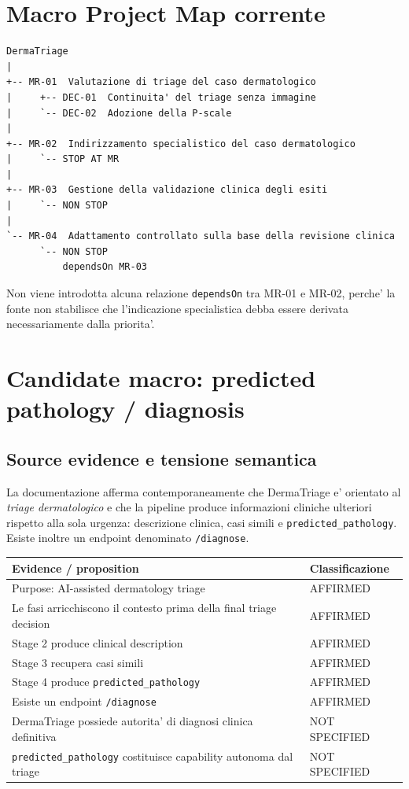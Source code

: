 \documentclass[11pt,a4paper]{article}
\begin{document}
\section{Macro Project Map corrente}

\begin{ddtacore}[title={State after MR-02 / MR-03 / MR-04 review}]
\begin{lstlisting}
DermaTriage
|
+-- MR-01  Valutazione di triage del caso dermatologico
|     +-- DEC-01  Continuita' del triage senza immagine
|     `-- DEC-02  Adozione della P-scale
|
+-- MR-02  Indirizzamento specialistico del caso dermatologico
|     `-- STOP AT MR
|
+-- MR-03  Gestione della validazione clinica degli esiti
|     `-- NON STOP
|
`-- MR-04  Adattamento controllato sulla base della revisione clinica
      `-- NON STOP
          dependsOn MR-03
\end{lstlisting}
\end{ddtacore}

Non viene introdotta alcuna relazione \texttt{dependsOn} tra MR-01 e MR-02, perche' la fonte non stabilisce che l'indicazione specialistica debba essere derivata necessariamente dalla priorita'.


\section{Candidate macro: predicted pathology / diagnosis}

\subsection{Source evidence e tensione semantica}

La documentazione afferma contemporaneamente che DermaTriage e' orientato al \emph{triage dermatologico} e che la pipeline produce informazioni cliniche ulteriori rispetto alla sola urgenza: descrizione clinica, casi simili e \texttt{predicted\_pathology}. Esiste inoltre un endpoint denominato \texttt{/diagnose}.

\begin{tabularx}{\textwidth}{L{67mm}L{33mm}}
\toprule
\textbf{Evidence / proposition} & \textbf{Classificazione} \\
\midrule
Purpose: AI-assisted dermatology triage & AFFIRMED \\
Le fasi arricchiscono il contesto prima della final triage decision & AFFIRMED \\
Stage 2 produce clinical description & AFFIRMED \\
Stage 3 recupera casi simili & AFFIRMED \\
Stage 4 produce \texttt{predicted\_pathology} & AFFIRMED \\
Esiste un endpoint \texttt{/diagnose} & AFFIRMED \\
DermaTriage possiede autorita' di diagnosi clinica definitiva & NOT SPECIFIED \\
\texttt{predicted\_pathology} costituisce capability autonoma dal triage & NOT SPECIFIED \\
\bottomrule
\end{tabularx}
\end{document}
